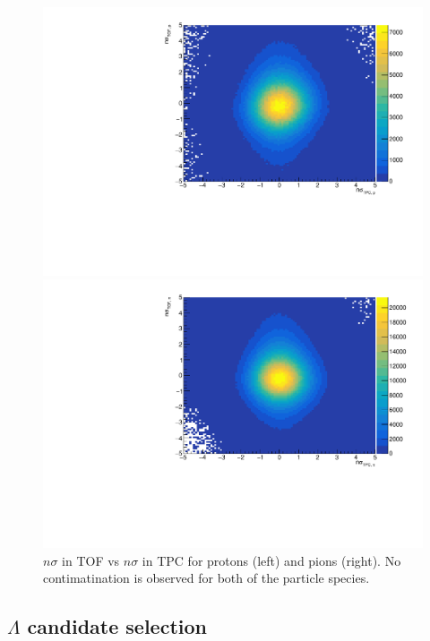 \begin{figure}[h]
	\centering
	\begin{minipage}{0.48\textwidth}
		\includegraphics[width=\textwidth]{figures/analysis/nsigma_tof_v_tpc_proton.pdf}
	\end{minipage}
	\begin{minipage}{0.48\textwidth}
		\includegraphics[width=\textwidth]{figures/analysis/nsigma_tof_v_tpc_pion.pdf}
	\end{minipage}
    \caption{$n\sigma$ in TOF vs $n\sigma$ in TPC for protons (left) and pions (right). No contimatination is observed for both of the particle species.}
	\label{fig:nsigma_tof_v_tpc}
\end{figure}

\subsection{$\Lambda$ candidate selection}


